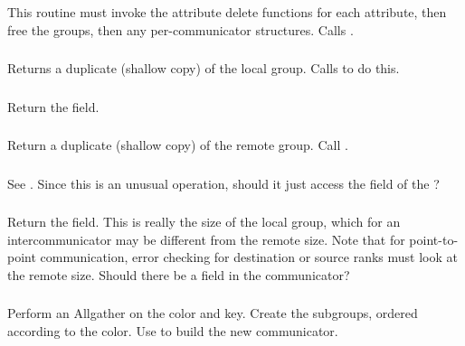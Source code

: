 \documentclass{article}
\begin{document}
\subsubsection{}
This routine must invoke the attribute delete functions for each
attribute, then free the groups, then any per-communicator
structures.  Calls .


\subsubsection{}
\begin{adi3}
  Returns a duplicate (shallow copy) of the local group.  Calls
   to do this. 
\end{adi3}

\subsubsection{}
Return the  field.

\subsubsection{}
\begin{adi3}
  Return a duplicate (shallow copy) of the remote group.  Call
  . 
\end{adi3}

\subsubsection{}
See .  Since this is an unusual operation, should
it just access the  field of the
? 

\subsubsection{}
Return the  field.  This is really the size of the local
group, which for an intercommunicator may be different from the remote
size.  Note that for point-to-point communication, error checking for
destination or source ranks must look at the remote size.  Should
there be a  field in the communicator?

\subsubsection{}
Perform an Allgather on the color and key.  Create the subgroups,
ordered according to the color.  Use  to
build the new communicator.
\end{document}
